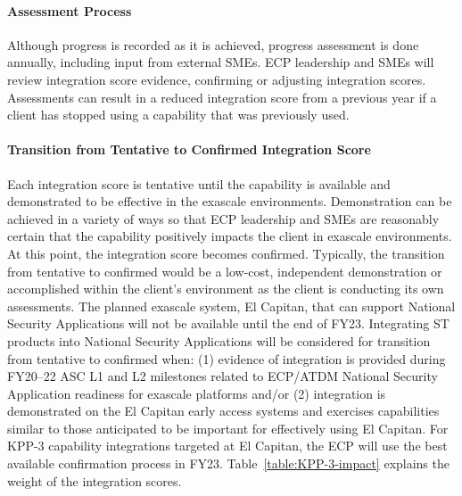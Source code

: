 \paragraph{Assessment Process}
Although progress is recorded as it is achieved, progress assessment is done annually, including input from external SMEs.  ECP leadership and SMEs will review integration score evidence, confirming or adjusting integration scores.
Assessments can result in a reduced integration score from a previous year if a client has stopped using a capability that was previously used.

\paragraph{Transition from Tentative to Confirmed Integration Score}
Each integration score is tentative until the capability is available and demonstrated to be effective in the exascale environments.  Demonstration can be achieved in a variety of ways so that ECP leadership and SMEs are reasonably certain that the capability positively impacts the client in exascale environments.  At this point, the integration score becomes confirmed. 
Typically, the transition from tentative to confirmed would be a low-cost, independent demonstration or accomplished within the client’s environment as the client is conducting its own assessments. 
The planned exascale system, El Capitan, that can support National Security Applications will not be available until the end of FY23. Integrating ST products into National Security Applications will be considered for transition from tentative to confirmed when: (1) evidence of integration is provided during FY20--22 ASC L1 and L2 milestones related to ECP/ATDM National Security Application readiness for exascale platforms and/or (2) integration is demonstrated on the El Capitan early access systems and exercises capabilities similar to those anticipated to be important for effectively using El Capitan.  For KPP-3 capability integrations targeted at El Capitan, the ECP will use the best available confirmation process in FY23. Table~\ref{table:KPP-3-impact} explains the weight of the integration scores. 


